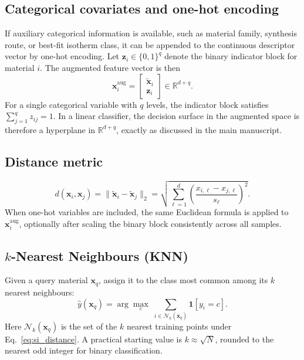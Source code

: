\documentclass[journal=jacsat,manuscript=article]{achemso}
\begin{document}
\subsection{Categorical covariates and one-hot encoding}
\label{sec:si_onehot}

If auxiliary categorical information is available, such as material
family, synthesis route, or best-fit isotherm class, it can be appended
to the continuous descriptor vector by one-hot encoding. Let
$\mathbf{z}_i \in \{0,1\}^{q}$ denote the binary indicator block for
material $i$. The augmented feature vector is then
\begin{equation}
	\mathbf{x}_i^{\mathrm{aug}}
	=
	\begin{bmatrix}
	\tilde{\mathbf{x}}_i\\
	\mathbf{z}_i
	\end{bmatrix}
	\in \mathbb{R}^{d+q}.
	\label{eq:si_onehot}
\end{equation}
For a single categorical variable with $q$ levels, the indicator block
satisfies $\sum_{j=1}^{q} z_{ij} = 1$. In a linear classifier, the
decision surface in the augmented space is therefore a hyperplane in
$\mathbb{R}^{d+q}$, exactly as discussed in the main manuscript.

\subsection{Distance metric}
\label{sec:si_distance_metric}
\begin{equation}
	d(\mathbf{x}_i, \mathbf{x}_j)
	= \|\tilde{\mathbf{x}}_i - \tilde{\mathbf{x}}_j\|_2
	= \sqrt{\sum_{\ell=1}^{d}
		\left(\frac{x_{i,\ell} - x_{j,\ell}}{s_\ell}\right)^{\!2}}.
	\label{eq:si_distance}
\end{equation}
When one-hot variables are included, the same Euclidean formula is
applied to $\mathbf{x}_i^{\mathrm{aug}}$, optionally after scaling the
binary block consistently across all samples.

\subsection{$k$-Nearest Neighbours (KNN)}
\label{sec:si_KNN}

Given a query material $\mathbf{x}_q$, assign it to the class
most common among its $k$ nearest neighbours:
\begin{equation}
	\hat{y}(\mathbf{x}_q)
	= \arg\max_{c}\;
	\sum_{i \in \mathcal{N}_k(\mathbf{x}_q)} \mathbf{1}[y_i = c].
	\label{eq:si_KNN}
\end{equation}
Here $\mathcal{N}_k(\mathbf{x}_q)$ is the set of the $k$ nearest
training points under Eq.~\eqref{eq:si_distance}. A practical starting
value is $k \approx \sqrt{N}$, rounded to the nearest odd integer for
binary classification.
\end{document}
